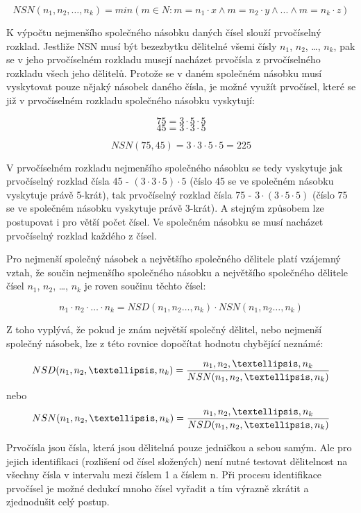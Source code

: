 $$NSN(n_1, n_2, …, n_k) = min(m \in N: m = n_1\cdot x \wedge m = n_2\cdot y \wedge ... \wedge m = n_k\cdot z)$$


K výpočtu nejmenšího společného násobku daných čísel slouží prvočíselný rozklad. Jestliže NSN musí být bezezbytku dělitelné všemi čísly $n_1$, $n_2$, …, $n_k$, pak se v jeho prvočíselném rozkladu musejí nacházet prvočísla z prvočíselného rozkladu všech jeho dělitelů. Protože se v daném společném násobku musí vyskytovat pouze nějaký násobek daného čísla, je možné využít prvočísel, které se již v prvočíselném rozkladu společného násobku vyskytují:

$$ 75 = 3\cdot 5 \cdot 5 $$
$$ 45 = 3\cdot 3 \cdot 5 $$

$$ NSN(75,45) = 3 \cdot 3 \cdot 5 \cdot 5 = 225$$

V prvočíselném rozkladu nejmenšího společného násobku se tedy vyskytuje jak prvočíselný rozklad čísla 45 - $(3 \cdot 3 \cdot 5) \cdot 5 $ (číslo 45 se ve společném násobku vyskytuje právě 5-krát), tak prvočíselný rozklad čísla 75 - $3 \cdot (3 \cdot 5 \cdot 5) $ (číslo 75 se ve společném násobku vyskytuje právě 3-krát). A stejným způsobem lze postupovat i pro větší počet čísel. Ve společném násobku se musí nacházet prvočíselný rozklad každého z čísel.


Pro nejmenší společný násobek a největšího společného dělitele platí vzájemný vztah, že součin nejmenšího společného násobku a největšího společného dělitele čísel $n_1$, $n_2$, …, $n_k$ je roven součinu těchto čísel:

$$ n_1 \cdot n_2 \cdot … \cdot n_k = NSD(n_1, n_2 …, n_k) \cdot NSN(n_1, n_2 …, n_k) $$

Z toho vyplývá, že pokud je znám největší společný dělitel, nebo nejmenší společný násobek, lze z této rovnice dopočítat hodnotu chybějící neznámé:

$$ NSD(n_1, n_2, …, n_k) = {{n_1, n_2, …, n_k} \over NSN(n_1, n_2, …, n_k)}$$
nebo
$$ NSN(n_1, n_2, …, n_k) = {{n_1, n_2, …, n_k} \over NSD(n_1, n_2, …, n_k)}$$


Prvočísla jsou čísla, která jsou dělitelná pouze jedničkou a sebou samým. Ale pro jejich identifikaci (rozlišení od čísel složených) není nutné testovat dělitelnost na všechny čísla v intervalu mezi číslem 1 a číslem n. Při procesu identifikace prvočísel je možné dedukcí mnoho čísel vyřadit a tím výrazně zkrátit a zjednodušit celý postup.

